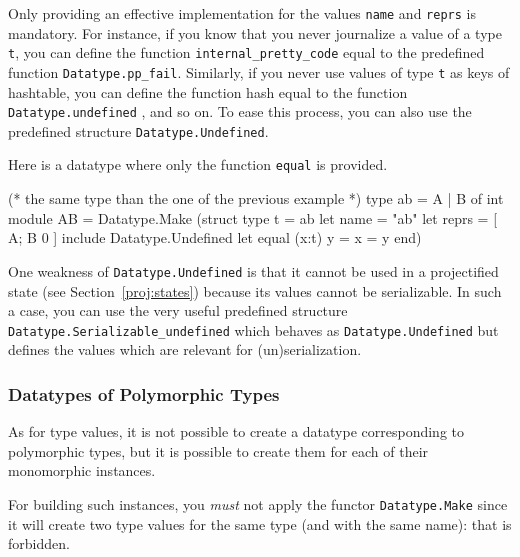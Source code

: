 Only providing an effective implementation for the values \texttt{name} and
\texttt{reprs} is mandatory. For instance, if you know that you never journalize
a value of a type \texttt{t}, you can define the function
\texttt{internal\_pretty\_code} equal to the predefined function
\texttt{Datatype.pp\_fail}. Similarly, if you never
use values of type \texttt{t} as keys of hashtable, you can define the function
hash equal to the function
\texttt{Datatype.undefined} , and so on. To ease
this process, you can also use the predefined structure
\texttt{Datatype.Undefined}.
\begin{example}
  Here is a datatype where only the function \texttt{equal} is provided.
\begin{ocamlcode}
(* the same type than the one of the previous example *)
type ab = A | B of int
module AB =
  Datatype.Make
    (struct
       type t = ab
       let name = "ab"
       let reprs = [ A; B 0 ]
       include Datatype.Undefined
       let equal (x:t) y = x = y
    end)
\end{ocamlcode}
\end{example}

One weakness of \texttt{Datatype.Undefined} is that it cannot be used in a
projectified state (see Section~\ref{proj:states}) because its values cannot be
serializable. In such a case, you can use the very useful predefined structure
\texttt{Datatype.Serializable\_undefined}%
 which behaves as
\texttt{Datatype.Undefined} but defines the values which are relevant for
(un)serialization.

\subsubsection{Datatypes of Polymorphic Types}

As for type values, it is not possible to create a datatype corresponding to
polymorphic types, but it is possible to create them for each of their
monomorphic instances. 

\begin{important}
For building such instances, you \emph{must} not apply the functor
\texttt{Datatype.Make} since it will create two type
values for the same type (and with the same name): that is forbidden.
\end{important}

